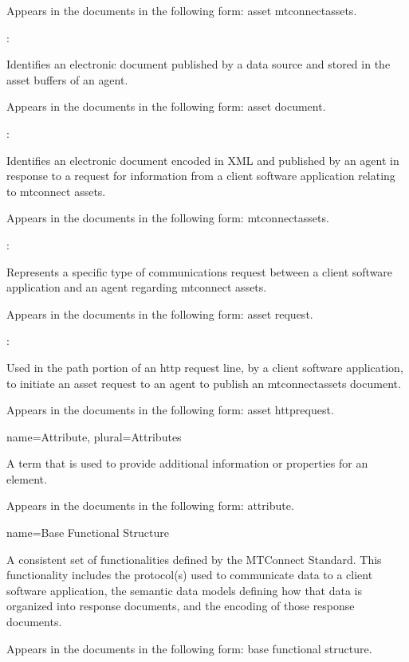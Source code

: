 {\begin{itemize}
      Appears in the documents in the following form: \gls{asset mtconnectassets}.
  \end{itemize}

  :

  Identifies an electronic document published by a data source and stored in the \glspl{asset buffer} of an \gls{agent}.
  
  Appears in the documents in the following form: \gls{asset document}.
  
  :

  Identifies an electronic document encoded in XML and published by an \gls{agent} in response to a \gls{request} for information from a client software application relating to \glspl{mtconnect asset}.

  Appears in the documents in the following form: \gls{mtconnectassets}.

  :

  Represents a specific type of communications request between a client software application and an \gls{agent} regarding \glspl{mtconnect asset}.

  Appears in the documents in the following form: \gls{asset request}.

  :

  Used in the path portion of an \gls{http request line}, by a client software application, to initiate an \gls{asset request} to an \gls{agent} to publish an \gls{mtconnectassets} document.

  Appears in the documents in the following form: \gls{asset httprequest}.
}


{
  name={Attribute},
  plural={Attributes}
}
{
  A term that is used to provide additional information or properties for an element.

  Appears in the documents in the following form: attribute.
}


{
  name={Base Functional Structure}
}
{
  A consistent set of functionalities defined by the MTConnect Standard. This functionality includes the protocol(s) used to communicate data to a client software application, the \glspl{semantic data model} defining how that data is organized into \glspl{response document}, and the encoding of those \glspl{response document}.

  Appears in the documents in the following form: \gls{base functional structure}.
}

